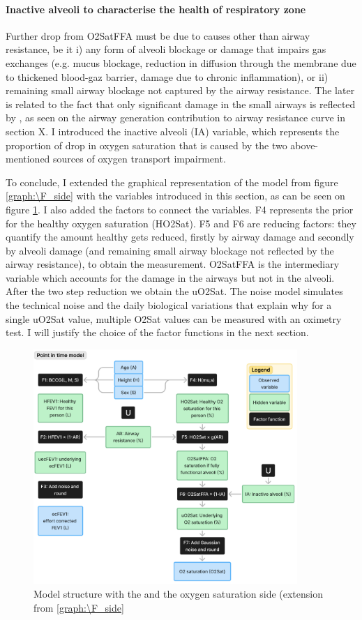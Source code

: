 \paragraph{Inactive alveoli to characterise the health of respiratory zone}
Further drop from O2SatFFA must be due to causes other than airway resistance, be it i) any form of alveoli blockage or damage that impairs gas exchanges (e.g. mucus blockage, reduction in diffusion through the membrane due to thickened blood-gaz barrier, damage due to chronic inflammation), or ii) remaining small airway blockage not captured by the airway resistance. The later is related to the fact that only significant damage in the small airways is reflected by \F, as seen on the airway generation contribution to airway resistance curve in section X.  I introduced the inactive alveoli (IA) variable, which represents the proportion of drop in oxygen saturation that is caused by the two above-mentioned sources of oxygen transport impairment.

To conclude, I extended the graphical representation of the model from figure \ref{graph:\F_side} with the variables introduced in this section, as can be seen on figure \ref{graph:o2_side}. I also added the factors to connect the variables. F4 represents the prior for the healthy oxygen saturation (HO2Sat). F5 and F6 are reducing factors: they quantify the amount healthy \OXSat gets reduced, firstly by airway damage and secondly by alveoli damage (and remaining small airway blockage not reflected by the airway resistance), to obtain the \OXSat measurement. O2SatFFA is the intermediary variable which accounts for the damage in the airways but not in the alveoli. After the two step reduction we obtain the uO2Sat. The noise model simulates the technical noise and the daily biological variations that explain why for a single uO2Sat value, multiple O2Sat values can be measured with an oximetry test. I will justify the choice of the factor functions in the next section.

\begin{figure}[!h]
    \centering
    \includegraphics[width=100mm]{Chapter1/Figs/o2_sat_model_structure.png}
    \caption{Model structure with the \F and the oxygen saturation side (extension from \ref{graph:\F_side}}
    \label{graph:o2_side}
\end{figure}

